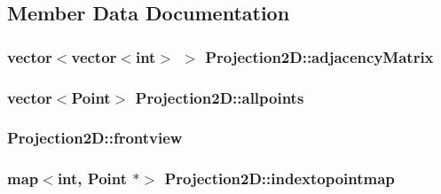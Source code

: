 \subsection{Member Data Documentation}
\subsubsection[{\texorpdfstring{adjacency\+Matrix}{adjacencyMatrix}}]{\setlength{\rightskip}{0pt plus 5cm}vector$<$vector$<$int$>$ $>$ Projection2\+D\+::adjacency\+Matrix}\hypertarget{class_projection2_d_a0a4be368b0a7233a1aa93efe17c7314e}{}\label{class_projection2_d_a0a4be368b0a7233a1aa93efe17c7314e}
\subsubsection[{\texorpdfstring{allpoints}{allpoints}}]{\setlength{\rightskip}{0pt plus 5cm}vector$<${\bf Point}$>$ Projection2\+D\+::allpoints}\hypertarget{class_projection2_d_aacafd767e5289005e7ec5d48c791d02f}{}\label{class_projection2_d_aacafd767e5289005e7ec5d48c791d02f}
\subsubsection[{\texorpdfstring{frontview}{frontview}}]{ Projection2\+D\+::frontview}\hypertarget{class_projection2_d_a1eb4d010190b1bd62bf0f9c4e4afc88a}{}\label{class_projection2_d_a1eb4d010190b1bd62bf0f9c4e4afc88a}
\subsubsection[{\texorpdfstring{indextopointmap}{indextopointmap}}]{\setlength{\rightskip}{0pt plus 5cm}map$<$int, {\bf Point} $\ast$$>$ Projection2\+D\+::indextopointmap}\hypertarget{class_projection2_d_a08675aad4022218dc78dd54187be18a9}{}\label{class_projection2_d_a08675aad4022218dc78dd54187be18a9}

